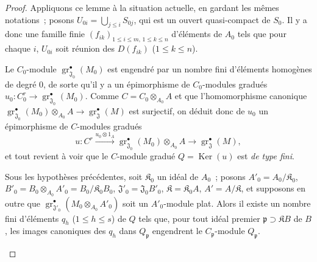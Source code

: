 \begin{proof}
Appliquons ce lemme à la situation actuelle, en gardant les mêmes notations~;
posons $U_{0i}=\bigcup_{j\leq i}S_{0j}$, qui est un ouvert quasi-compact de
$S_0$. Il y a donc une famille
finie $(f_{ik})_{1\leq i\leq m,\,1\leq k\leq n}$ d'éléments de $A_0$ tels que pour
chaque $i$, $U_{0i}$ soit réunion des $D(f_{ik})$ ($1\leq k\leq n$).


Le $C_0$-module $\operatorname{gr}_{\mathfrak J_0}^\bullet(M_0)$ est engendré par
un nombre fini d'éléments homogènes de degré 0, de sorte qu'il y a un
épimorphisme de $C_0$-modules gradués
$u_0:C_0^r\longrightarrow\operatorname{gr}_{\mathfrak J_0}^\bullet(M_0)$.
Comme $C=C_0\otimes_{A_0}A$ et que l'homomorphisme canonique
$\operatorname{gr}_{\mathfrak J_0}^\bullet(M_0)\otimes_{A_0}A
\to\operatorname{gr}_{\mathfrak J}^\bullet(M)$ est surjectif, on déduit donc de
$u_0$ un épimorphisme de $C$-modules gradués
\[
u:C^r\xrightarrow{u_0\otimes1_A}
\operatorname{gr}_{\mathfrak J_0}^\bullet(M_0)\otimes_{A_0}A
\longrightarrow\operatorname{gr}_{\mathfrak J}^\bullet(M),
\]
et tout revient à voir que le $C$-module gradué $Q=\operatorname{Ker}(u)$ est \emph{de type
fini}.

\begin{lemma}[11.2.9.6]
\label{IV.11.2.9.6-fr}
Sous les hypothèses précédentes, soit $\mathfrak K_0$ un idéal de $A_0$~;
posons
$A'_0=A_0/\mathfrak K_0$, $B'_0=B_0\otimes_{A_0}A'_0=B_0/\mathfrak K_0B_0$,
$\mathfrak J'_0=\mathfrak J_0B'_0$, $\mathfrak K=\mathfrak K_0A$, $A'=A/\mathfrak K$, et supposons en outre
que $\operatorname{gr}_{\mathfrak J'_0}^\bullet(M_0\otimes_{A_0}A'_0)$ soit un
$A'_0$-module plat. Alors il existe un nombre fini d'éléments $q_h$
\textup{(}$1\leq h\leq s$\textup{)} de $Q$ tels que, pour tout idéal premier
$\mathfrak p\supset\mathfrak KB$ de $B$, les images canoniques des $q_h$ dans
$Q_\mathfrak p$ engendrent le $C_\mathfrak p$-module $Q_\mathfrak p$.
\end{lemma}


\end{proof}
